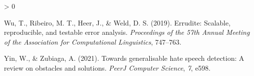 \documentclass[
  10pt,
  dvipsnames,enabledeprecatedfontcommands]{scrartcl}
\newlength{\cslhangindent}
\newenvironment{CSLReferences}[2] %
 {%
  \setlength{\parindent}{0pt}
  \ifodd #1 \everypar{\setlength{\hangindent}{\cslhangindent}}\ignorespaces\fi
  \ifnum #2 > 0
  \setlength{\parskip}{#2\baselineskip}
  \fi
 }%
 {}
\begin{document}
\begin{CSLReferences}{1}{0}
\leavevmode\hypertarget{ref-wu2019errudite}{}%
Wu, T., Ribeiro, M. T., Heer, J., \& Weld, D. S. (2019). Errudite:
Scalable, reproducible, and testable error analysis. \emph{Proceedings
of the 57th Annual Meeting of the Association for Computational
Linguistics}, 747--763.

\leavevmode\hypertarget{ref-yin2021towards}{}%
Yin, W., \& Zubiaga, A. (2021). Towards generalisable hate speech
detection: A review on obstacles and solutions. \emph{PeerJ Computer
Science}, \emph{7}, e598.

\end{CSLReferences}
\end{document}
